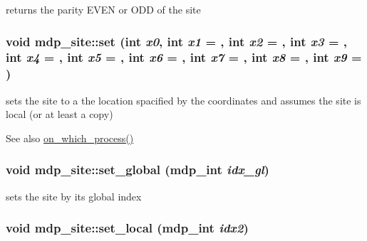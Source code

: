 returns the parity EVEN or ODD of the site \hypertarget{classmdp__site_a241eb259576cbe7354d1ff714d22416c}{
\subsubsection[{set}]{\setlength{\rightskip}{0pt plus 5cm}void mdp\_\-site::set (int {\em x0}, \/  int {\em x1} = {}, \/  int {\em x2} = {}, \/  int {\em x3} = {}, \/  int {\em x4} = {}, \/  int {\em x5} = {}, \/  int {\em x6} = {}, \/  int {\em x7} = {}, \/  int {\em x8} = {}, \/  int {\em x9} = {})}}
\label{classmdp__site_a241eb259576cbe7354d1ff714d22416c}
sets the site to a the location spacified by the coordinates and assumes the site is local (or at least a copy) \begin{DoxySeeAlso}{See also}
\hyperlink{classmdp__site_ac96405ecdb78dc33d55edea04876a931}{on\_\-which\_\-process()} 
\end{DoxySeeAlso}
\hypertarget{classmdp__site_ad0b34065c28aa0abaaf5b742b459bc77}{
\subsubsection[{set\_\-global}]{\setlength{\rightskip}{0pt plus 5cm}void mdp\_\-site::set\_\-global ({\bf mdp\_\-int} {\em idx\_\-gl})}}
\label{classmdp__site_ad0b34065c28aa0abaaf5b742b459bc77}


sets the site by its global index \hypertarget{classmdp__site_a9545484331e101ce177d0877df305cbe}{
\subsubsection[{set\_\-local}]{\setlength{\rightskip}{0pt plus 5cm}void mdp\_\-site::set\_\-local ({\bf mdp\_\-int} {\em idx2})}}
\label{classmdp__site_a9545484331e101ce177d0877df305cbe}


